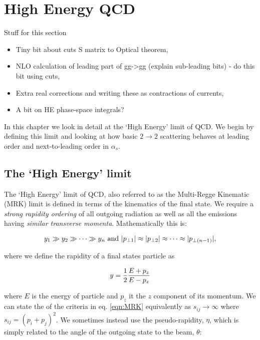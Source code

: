 \chapter{High Energy QCD}
\label{chap:HEQCD}

	{\color{red}
	Stuff for this section
	\begin{itemize}
		\item Tiny bit about cuts S matrix to Optical theorem,
		\item NLO calculation of leading part of gg->gg (explain sub-leading bits) - do this bit using cuts,
		\item Extra real corrections and writing these as contractions of currents,
		\item A bit on HE phase-space integrals?
	\end{itemize}
	}

	In this chapter we look in detail at the `High Energy' limit of QCD.  We begin by defining this limit and
	looking at how basic $2\rightarrow2$ scattering behaves at leading order and next-to-leading order in
	$\alpha_s$.

	\section{The `High Energy' limit}
		\label{sub:HElimit}

		The `High Energy' limit of QCD, also referred to as the Multi-Regge Kinematic (MRK) limit is
		defined in terms of the kinematics of the final state.  We require a \emph{strong rapidity ordering}
		of all outgoing radiation as well as all the emissions having \emph{similar transverse momenta}.
		Mathematically this is:

		\begin{equation}
			y_1\gg y_2\gg\cdots\gg\\y_n \text{ and } |p_{\perp1}| \approx |p_{\perp2}| \approx\cdots\approx|p_{\perp(n-1)}|,
			\label{eqn:MRK}
		\end{equation}

  		where we define the rapidity of a final states particle as

		\begin{equation}
			y = \frac{1}{2}\frac{E+p_z}{E-p_z}
			\label{eqn:rap}
		\end{equation}

		where $E$ is the energy of particle and $p_z$ it the $z$ component of its momentum. We can
		state the of the criteria in eq. \eqref{eqn:MRK} equivalently as $s_{ij}\rightarrow\infty$ where
		$s_{ij} = (p_i + p_j)^2$.  We sometimes instead use the pseudo-rapidity, $\eta$, which is
		simply related to the angle of the outgoing state to the beam, $\theta$:

